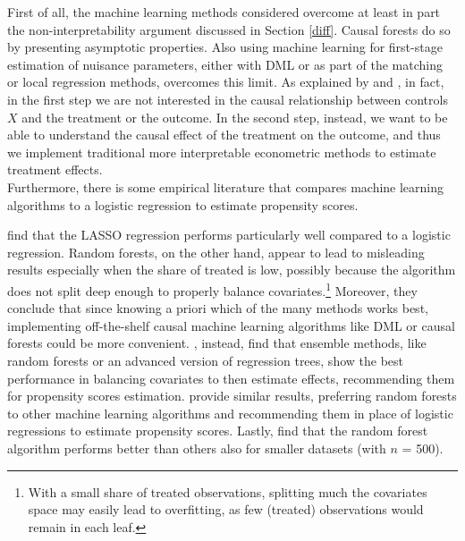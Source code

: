 \documentclass[12pt,a4paper,openright,twoside]{book}
\begin{document}
\begin{doublespacing}
First of all, the machine learning methods considered overcome at least in part the non-interpretability argument discussed in Section \ref{diff}. Causal forests do so by presenting asymptotic properties. Also using machine learning for first-stage estimation of nuisance parameters, either with DML or as part of the matching or local regression methods, overcomes this limit. As explained by \citet{lechner2023} and \citet{lee2010improving}, in fact, in the first step we are not interested in the causal relationship between controls $X$ and the treatment or the outcome. 
In the second step, instead, we want to be able to understand the causal effect of the treatment on the outcome, and thus we implement traditional more interpretable econometric methods to estimate treatment effects.  \\

Furthermore, there is some empirical literature that compares machine learning algorithms to a logistic regression to estimate propensity scores. 

\citet{goller2020does} find that the LASSO regression performs particularly well compared to a logistic regression. Random forests, on the other hand, appear to lead to misleading results especially when the share of treated is low, possibly because the algorithm does not split deep enough to properly balance covariates.\footnote{With a small share of treated observations, splitting much the covariates space may easily lead to overfitting, as few (treated) observations would remain in each leaf.} Moreover, they conclude that since knowing a priori which of the many methods works best, implementing off-the-shelf causal machine learning algorithms like DML or causal forests could be more convenient. 
\citet{lee2010improving}, instead, find that ensemble methods, like random forests or an advanced version of regression trees, show the best performance in balancing covariates to then estimate effects, recommending them for propensity scores estimation. \citet{cannas2019comparison} provide similar results, preferring random forests to other machine learning algorithms and recommending them in place of logistic regressions to estimate propensity scores. 
Lastly, \citet{lee2010improving} find that the random forest algorithm performs better than others also for smaller datasets (with $n$ = 500). \\


\end{doublespacing}
\end{document}
